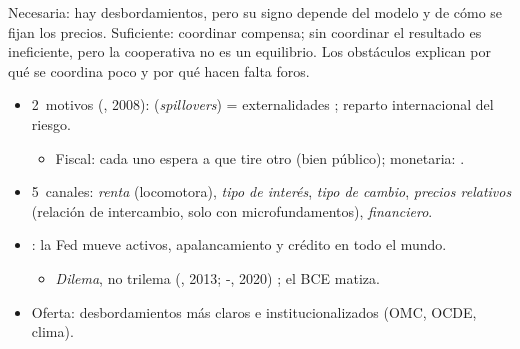 \documentclass{article}
\begin{document}
\begin{columnas}
\begin{ideaclave}
Necesaria: hay desbordamientos, pero su signo depende del modelo y de cómo se fijan los precios. Suficiente: coordinar compensa; sin coordinar el resultado es ineficiente, pero la cooperativa no es un equilibrio. Los obstáculos explican por qué se coordina poco y por qué hacen falta foros.
\end{ideaclave}

\begin{itemize}
\item 2~motivos (, 2008):  (\emph{spillovers}) = externalidades ; reparto internacional del riesgo.
  \begin{itemize}
  \item Fiscal: cada uno espera a que tire otro (bien público); monetaria: .
  \end{itemize}
\item 5~canales: \emph{renta} (locomotora), \emph{tipo de interés}, \emph{tipo de cambio}, \emph{precios relativos} (relación de intercambio, solo con microfundamentos), \emph{financiero}.
\item {}: la Fed mueve activos, apalancamiento y crédito en todo el mundo.
  \begin{itemize}
  \item \emph{Dilema}, no trilema (, 2013; -, 2020) ; el BCE matiza.
  \end{itemize}
\item Oferta: desbordamientos más claros e institucionalizados (OMC, OCDE, clima).
\end{itemize}


\end{columnas}
\end{document}
